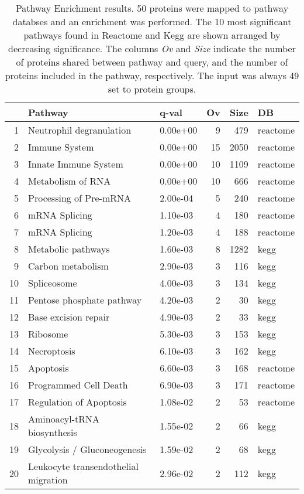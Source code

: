\begin{table}[ht]
\centering
\begin{tabular}{rllrrl}
  \hline
 & Pathway & q-val & Ov & Size & DB \\ 
  \hline
1 & Neutrophil degranulation & 0.00e+00 &   9 & 479 & reactome \\ 
  2 & Immune System & 0.00e+00 &  15 & 2050 & reactome \\ 
  3 & Innate Immune System & 0.00e+00 &  10 & 1109 & reactome \\ 
  4 & Metabolism of RNA & 0.00e+00 &  10 & 666 & reactome \\ 
  5 & Processing of Pre-mRNA & 2.00e-04 &   5 & 240 & reactome \\ 
  6 & mRNA Splicing & 1.10e-03 &   4 & 180 & reactome \\ 
  7 & mRNA Splicing & 1.20e-03 &   4 & 188 & reactome \\ 
  8 & Metabolic pathways & 1.60e-03 &   8 & 1282 & kegg \\ 
  9 & Carbon metabolism & 2.90e-03 &   3 & 116 & kegg \\ 
  10 & Spliceosome & 4.00e-03 &   3 & 134 & kegg \\ 
  11 & Pentose phosphate pathway & 4.20e-03 &   2 &  30 & kegg \\ 
  12 & Base excision repair & 4.90e-03 &   2 &  33 & kegg \\ 
  13 & Ribosome & 5.30e-03 &   3 & 153 & kegg \\ 
  14 & Necroptosis & 6.10e-03 &   3 & 162 & kegg \\ 
  15 & Apoptosis & 6.60e-03 &   3 & 168 & reactome \\ 
  16 & Programmed Cell Death & 6.90e-03 &   3 & 171 & reactome \\ 
  17 & Regulation of Apoptosis & 1.08e-02 &   2 &  53 & reactome \\ 
  18 & Aminoacyl-tRNA biosynthesis & 1.55e-02 &   2 &  66 & kegg \\ 
  19 & Glycolysis / Gluconeogenesis & 1.59e-02 &   2 &  68 & kegg \\ 
  20 & Leukocyte transendothelial migration & 2.96e-02 &   2 & 112 & kegg \\ 
   \hline
\end{tabular}
\caption{Pathway Enrichment results. 50 proteins were mapped to pathway databses and an enrichment was performed. The 10 most significant pathways found in Reactome and Kegg are shown arranged by decreasing significance. The columns \textit{Ov} and \textit{Size} indicate the number of proteins shared between pathway and query, and the number of proteins included in the pathway, respectively. The input was always 49 set to protein groups.}
\label{tab:pathway_enrichment}
\end{table}

